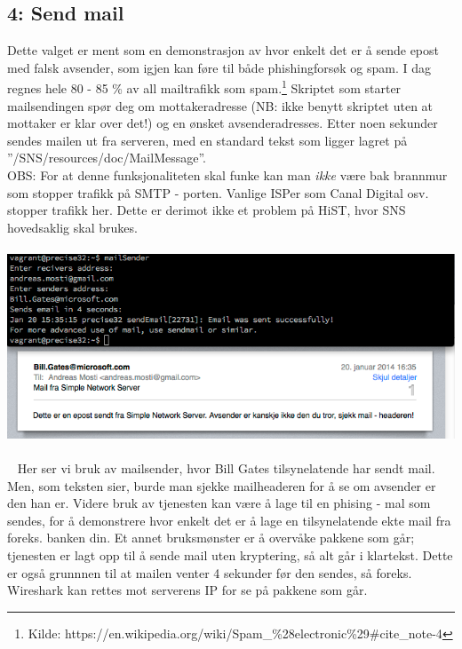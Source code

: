 \documentclass{article}
\begin{document}
\subsection{4: Send mail}
Dette valget er ment som en demonstrasjon av hvor enkelt det er å sende epost med falsk avsender, som igjen kan føre til både phishingforsøk og spam. I dag regnes hele 80 - 85 \% av all mailtrafikk som spam.\footnote{Kilde: https://en.wikipedia.org/wiki/Spam_\%28electronic\%29#cite_note-4} Skriptet som starter mailsendingen spør deg om mottakeradresse (NB: ikke benytt skriptet uten at mottaker er klar over det!) og en ønsket avsenderadresses. Etter noen sekunder sendes mailen ut fra serveren, med en standard tekst som ligger lagret på ''/SNS/resources/doc/MailMessage''. \\ OBS: For at denne funksjonaliteten skal funke kan man \textit{ikke} være bak brannmur som stopper trafikk på SMTP - porten. Vanlige ISPer som Canal Digital osv. stopper trafikk her. Dette er derimot ikke et problem på HiST, hvor SNS hovedsaklig skal brukes. 
\\ \\
\includegraphics[scale = 0.7]{pictures/mailsender.png}
\\ \\ 
Her ser vi bruk av mailsender, hvor Bill Gates tilsynelatende har sendt mail. Men, som teksten sier, burde man sjekke mailheaderen for å se om avsender er den han er. Videre bruk av tjenesten kan være å lage til en phising - mal som sendes, for å demonstrere hvor enkelt det er å lage en tilsynelatende ekte mail fra foreks. banken din. Et annet bruksmønster er å overvåke pakkene som går; tjenesten er lagt opp til å sende mail uten kryptering, så alt går i klartekst. Dette er også grunnnen til at mailen venter 4 sekunder før den sendes, så foreks. Wireshark kan rettes mot serverens IP for se på pakkene som går. 
\end{document}
